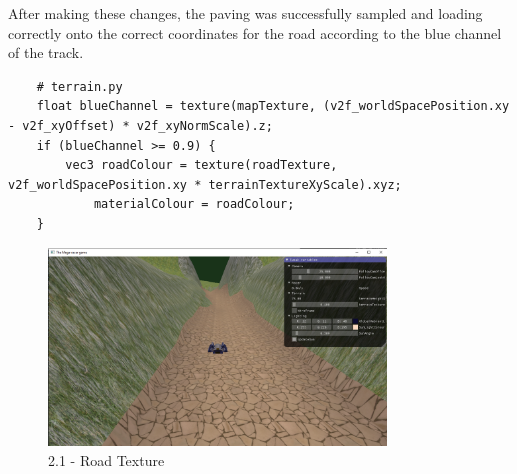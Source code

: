 \documentclass[a4 paper, 12pt]{article}
\begin{document}
After making these changes, the paving was successfully sampled and loading correctly onto the correct coordinates for the road according to the blue channel of the track.

    \begin{lstlisting}
    # terrain.py       
    float blueChannel = texture(mapTexture, (v2f_worldSpacePosition.xy - v2f_xyOffset) * v2f_xyNormScale).z;
    if (blueChannel >= 0.9) {
        vec3 roadColour = texture(roadTexture, v2f_worldSpacePosition.xy * terrainTextureXyScale).xyz;
            materialColour = roadColour;
    }
    \end{lstlisting} 

    \begin{figure} [H]
        \centering
        \includegraphics[width=0.8\textwidth, frame]
            {./images/2.1_c_final.PNG}
        \caption{2.1 - Road Texture}   
    \end{figure}
\end{document}
